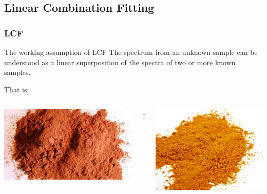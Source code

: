 \documentclass[10pt, xcolor=x11names, compress]{beamer}
\begin{document}
\subsection[LCF]{Linear Combination Fitting}

\begin{frame}
  \frametitle{LCF}

  \begin{block}{The working assumption of LCF}
    The spectrum from an unknown sample can be understood as a linear
    superposition of the spectra of two or more known samples.
  \end{block}

  That is:

  \begin{columns}
    \begin{column}{0.2\linewidth}
      \includegraphics[width=\linewidth]{images/cinnamon_powder.jpg}
    \end{column}
    \begin{column}{0.03\linewidth}
      +
    \end{column}
    \begin{column}{0.2\linewidth}
      \includegraphics[width=\linewidth]{images/curry-powder.jpg} 

\end{column}
\end{columns}
\end{frame}
\end{document}
